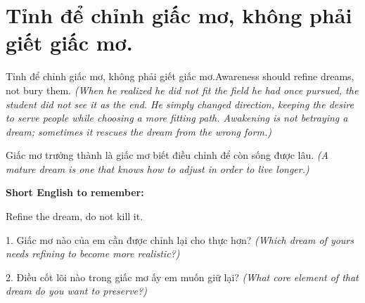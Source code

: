 \section{Tỉnh để chỉnh giấc mơ, không phải giết giấc mơ.}
\begin{truyen}{Tỉnh để chỉnh giấc mơ, không phải giết giấc mơ.}{Awareness should refine dreams, not bury them.}
\textit{(When he realized he did not fit the field he had once pursued, the student did not see it as the end. He simply changed direction, keeping the desire to serve people while choosing a more fitting path. Awakening is not betraying a dream; sometimes it rescues the dream from the wrong form.)}
\end{truyen}
\begin{baihoc}
Giấc mơ trưởng thành là giấc mơ biết điều chỉnh để còn sống được lâu.
\textit{(A mature dream is one that knows how to adjust in order to live longer.)}
\end{baihoc}
\begin{ghinhoanh}
\textbf{Short English to remember:}

Refine the dream, do not kill it.
\end{ghinhoanh}
\begin{tuhocnhanh}
1. Giấc mơ nào của em cần được chỉnh lại cho thực hơn? \textit{(Which dream of yours needs refining to become more realistic?)}

2. Điều cốt lõi nào trong giấc mơ ấy em muốn giữ lại? \textit{(What core element of that dream do you want to preserve?)}
\end{tuhocnhanh}
\ngancach
